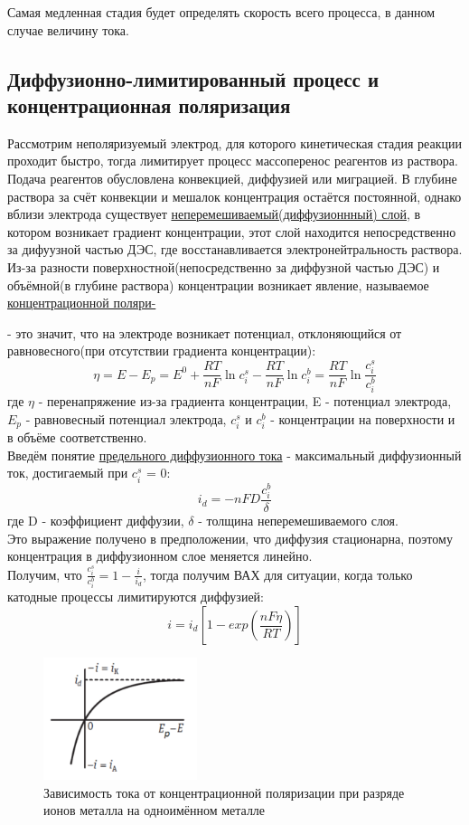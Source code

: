 \documentclass[a4paper,12pt]{article}
\begin{document}
Самая медленная стадия будет определять скорость всего процесса, в данном случае величину тока.\\
\subsection{Диффузионно-лимитированный процесс и концентрационная поляризация}
Рассмотрим неполяризуемый электрод, для которого кинетическая стадия реакции проходит быстро, тогда лимитирует процесс массоперенос реагентов из раствора. Подача реагентов обусловлена конвекцией, диффузией или миграцией. В глубине раствора за счёт конвекции и мешалок концентрация остаётся постоянной, однако вблизи электрода существует \underline{неперемешиваемый(диффузионнный) слой}, в котором возникает градиент концентрации, этот слой находится непосредственно за дифуузной частью ДЭС, где восстанавливается электронейтральность раствора.\\
Из-за разности поверхностной(непосредственно за диффузной частью ДЭС) и объёмной(в глубине раствора) концентрации возникает явление, называемое \underline{концентрационной поляри-}\\
\usepackage{зацией} - это значит, что на электроде возникает потенциал, отклоняющийся от равновесного(при отсутствии градиента концентрации):
\[ \eta = E - E_p = E^0 + \frac{RT}{nF}\ln{c_i^s} - \frac{RT}{nF}\ln{c_i^b} = \frac{RT}{nF}\ln{\frac{c_i^s}{c_i^b}} \]
где $\eta$ - перенапряжение из-за градиента концентрации, E - потенциал электрода, $E_p$ - равновесный потенциал электрода, $c_i^s$ и $c_i^b$ - концентрации на поверхности и в объёме соответственно.\\

Введём понятие \underline{предельного диффузионного тока} - максимальный диффузионный ток, достигаемый при $c_i^s$ = 0:
\[ i_d = -nFD\frac{c_i^b}{\delta} \]
где D - коэффициент диффузии, $\delta$ - толщина неперемешиваемого слоя.\\
Это выражение получено в предположении, что диффузия стационарна, поэтому концентрация в диффузионном слое меняется линейно.\\

Получим, что $\frac{c_i^s}{c_i^b} = 1 - \frac{i}{i_d}$, тогда получим ВАХ  для ситуации, когда только катодные процессы лимитируются диффузией:
\[ i = i_d[1 - exp(\frac{nF\eta}{RT})] \]

\begin{figure}[h!]
    \centering
    \includegraphics[width = 0.4\textwidth]{ВАХ_к.png}
    \caption{Зависимость тока от концентрационной поляризации при разряде ионов металла на одноимённом металле}
    \label{fig:no_int}
\end{figure}\\
\end{document}
